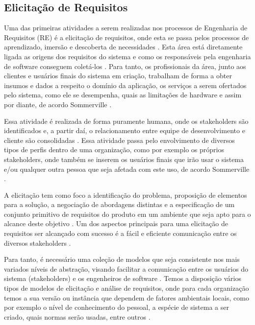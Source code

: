  \subsection{Elicitação de Requisitos}
 
 Uma das primeiras atividades a serem realizadas nos processos de Engenharia de Requisitos (RE) é a elicitação de requisitos, onde esta se passa pelos processos de aprendizado, imersão e descoberta de necessidades \cite{Hadar}. Esta área está diretamente ligada as origens dos requisitos do sistema e como os responsáveis pela engenharia de software conseguem coletá-los \cite{SWEBOK2014}. Para tanto, os profissionais da área, junto aos clientes e usuários finais do sistema em criação, trabalham de forma a obter insumos e dados a respeito o domínio da aplicação, os serviços a serem ofertados pelo sistema, como ele se desempenha, quais as limitações de hardware e assim por diante, de acordo Sommerville \cite{Sommerville07}.

Essa atividade é realizada de forma puramente humana, onde os stakeholders são identificados e, a partir daí, o relacionamento entre equipe de desenvolvimento e cliente são consolidadas \cite{SWEBOK2014}. Essa atividade passa pelo envolvimento de diversos tipos de perfis dentro de uma organização, como por exemplo os próprios stakeholders, onde também se inserem os usuários finais que irão usar o sistema e/ou qualquer outra pessoa que seja afetada com este uso, de acordo Sommerville \cite{Sommerville07}.

A elicitação tem como foco a identificação do problema, proposição de elementos para a solução, a negociação de abordagens distintas e a especificação de um conjunto primitivo de requisitos do produto em um ambiente que seja apto para o alcance deste objetivo \cite{pressman}. Um dos aspectos principais para uma elicitação de requisitos ser alcançado com sucesso é a fácil e eficiente comunicação entre os diversos stakeholders \cite{SWEBOK2014}.

Para tanto, é necessário uma coleção de modelos que seja consistente nos mais variados níveis de abstração, visando facilitar a comunicação entre os usuários do sistema (stakeholders) e os engenheiros de software \cite{SWEBOK2014}. Temos a disposição vários tipos de modelos de elicitação e análise de requisitos, onde para cada organização temos a sua versão ou instância que dependem de fatores ambientais locais, como por exemplo o nível de conhecimento do pessoal, a espécie de sistema a ser criado, quais normas serão usadas, entre outros \cite{Sommerville07}. 
 
